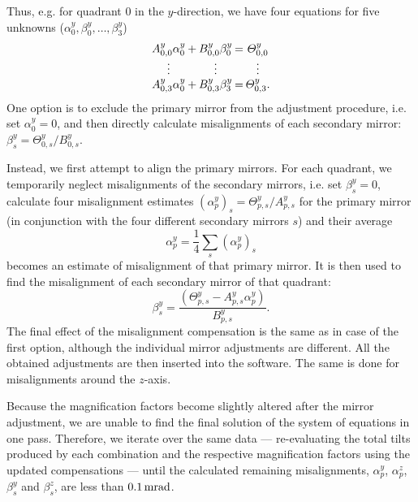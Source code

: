 Thus, e.g. for quadrant 0 in the $y$-direction, we have four equations for five
unknowns ($\alpha^{y}_{0},\beta^{y}_{0},\dotsc,\beta^{y}_{3}$)
\begin{equation*}
  \label{eq:zeroQuadrantMirrorTilts}
  \arraycolsep=1pt
  \begin{array}{*{5}c}
    A^y_{0,0}\alpha^y_0 & + & B^y_{0,0}\beta^y_0 & = & \varTheta^y_{0,0} \\
    \vdots              &   & \vdots             &   & \vdots \\
    A^y_{0,3}\alpha^y_0 & + & B^y_{0,3}\beta^y_3 & = & \varTheta^y_{0,3}.
  \end{array}
\end{equation*}
One option is to exclude the primary mirror from the adjustment procedure, i.e.
set $\alpha^y_0=0$, and then directly calculate misalignments of each secondary
mirror: $\beta^y_s=\varTheta^y_{0,s}/B^y_{0,s}$.

Instead, we first attempt to align the primary mirrors. For each quadrant, we
temporarily neglect misalignments of the secondary mirrors, i.e. set
$\beta^y_s=0$, calculate four misalignment estimates $(\alpha^y_p)_s =
\varTheta^y_{p,s}/A^y_{p,s}$ for the primary mirror (in conjunction with the
four different secondary mirrors $s$) and their average
\begin{equation*}
  \alpha^y_p = \frac{1}{4} \displaystyle\sum\limits_s(\alpha^y_p)_s
\end{equation*}
becomes an estimate of misalignment of that primary mirror. It is then
used to find the misalignment of each secondary mirror of that quadrant:
\begin{equation*}
  \beta^y_s = \frac{\left(\varTheta^y_{p,s} - A^y_{p,s}\alpha^y_p\right)}
                   {B^y_{p,s}}.
\end{equation*}
The final effect of the misalignment compensation is the same as in case of the
first option, although the individual mirror adjustments are different. All the
obtained adjustments are then inserted into the software. The same is done for
misalignments around the $z$-axis.

Because the magnification factors become slightly altered after the mirror
adjustment, we are unable to find the final solution of the system of equations
in one pass. Therefore, we iterate over the same data --- re-evaluating the
total tilts produced by each combination and the respective magnification
factors using the updated compensations --- until the calculated remaining
misalignments, $\alpha^y_p$, $\alpha^z_p$, $\beta^y_s$ and $\beta^z_s$, are less
than $0.1\rm \,mrad$.


